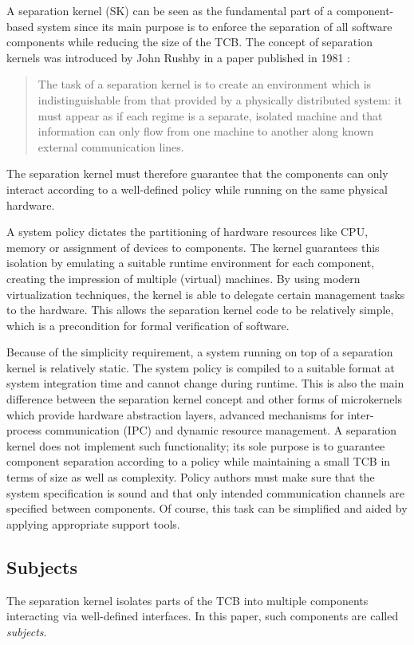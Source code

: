 A separation kernel (SK) can be seen as the fundamental
part of a component-based system since its main purpose is to enforce the
separation of all software components while reducing the size of the TCB. The
concept of separation kernels was introduced by John Rushby in a paper published
in 1981 \cite{rushby1981}:

\begin{quote}
The task of a separation kernel is to create an environment which is
indistinguishable from that provided by a physically distributed system: it
must appear as if each regime is a separate, isolated machine and that
information can only flow from one machine to another along known external
communication lines.
\end{quote}

The separation kernel must therefore guarantee that the components can only
interact according to a well-defined policy while running on the same physical
hardware.

A system policy dictates the partitioning of hardware resources like CPU,
memory or assignment of devices to components. The kernel guarantees this
isolation by emulating a suitable runtime environment for each component,
creating the impression of multiple (virtual) machines. By using modern
virtualization techniques, the kernel is able to delegate certain management
tasks to the hardware. This allows the separation kernel code to be relatively
simple, which is a precondition for formal verification of software.

Because of the simplicity requirement, a system running on top of a separation
kernel is relatively static. The system policy is compiled to a suitable format
at system integration time and cannot change during runtime. This is also the
main difference between the separation kernel concept and other forms of
microkernels which provide hardware abstraction layers, advanced mechanisms for
inter-process communication (IPC) and dynamic resource management. A
separation kernel does not implement such functionality; its sole purpose is to
guarantee component separation according to a policy while maintaining a small
TCB in terms of size as well as complexity. Policy authors must make sure that
the system specification is sound and that only intended communication channels
are specified between components. Of course, this task can be simplified and
aided by applying appropriate support tools.

\subsection{Subjects}
The separation kernel isolates parts of the TCB into multiple
components interacting via well-defined interfaces. In this
paper, such components are called \emph{subjects}.

